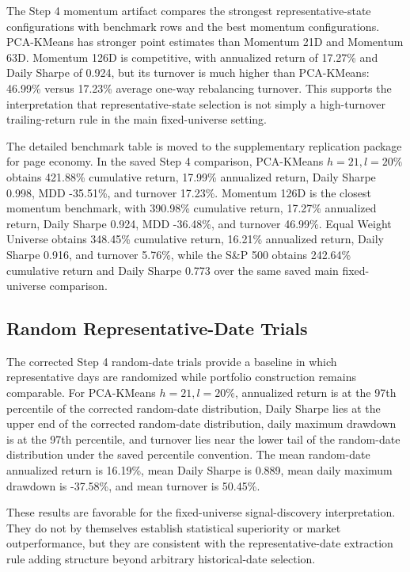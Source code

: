 \documentclass[runningheads]{llncs}
\begin{document}
The Step 4 momentum artifact compares the strongest representative-state configurations with benchmark rows and the best momentum configurations. PCA-KMeans has stronger point estimates than Momentum 21D and Momentum 63D. Momentum 126D is competitive, with annualized return of 17.27\% and Daily Sharpe of 0.924, but its turnover is much higher than PCA-KMeans: 46.99\% versus 17.23\% average one-way rebalancing turnover. This supports the interpretation that representative-state selection is not simply a high-turnover trailing-return rule in the main fixed-universe setting.


The detailed benchmark table is moved to the supplementary replication package for page economy. In the saved Step 4 comparison, PCA-KMeans $h=21,l=20\%$ obtains 421.88\% cumulative return, 17.99\% annualized return, Daily Sharpe 0.998, MDD -35.51\%, and turnover 17.23\%. Momentum 126D is the closest momentum benchmark, with 390.98\% cumulative return, 17.27\% annualized return, Daily Sharpe 0.924, MDD -36.48\%, and turnover 46.99\%. Equal Weight Universe obtains 348.45\% cumulative return, 16.21\% annualized return, Daily Sharpe 0.916, and turnover 5.76\%, while the S\&P 500 obtains 242.64\% cumulative return and Daily Sharpe 0.773 over the same saved main fixed-universe comparison.


\subsection{Random Representative-Date Trials}

The corrected Step 4 random-date trials provide a baseline in which representative days are randomized while portfolio construction remains comparable. For PCA-KMeans $h=21,l=20\%$, annualized return is at the 97th percentile of the corrected random-date distribution, Daily Sharpe lies at the upper end of the corrected random-date distribution, daily maximum drawdown is at the 97th percentile, and turnover lies near the lower tail of the random-date distribution under the saved percentile convention. The mean random-date annualized return is 16.19\%, mean Daily Sharpe is 0.889, mean daily maximum drawdown is -37.58\%, and mean turnover is 50.45\%.

These results are favorable for the fixed-universe signal-discovery interpretation. They do not by themselves establish statistical superiority or market outperformance, but they are consistent with the representative-date extraction rule adding structure beyond arbitrary historical-date selection.
\end{document}
